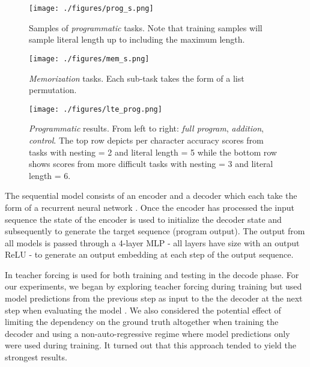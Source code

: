 \documentclass{article}
\begin{document}
\begin{figure}
    \centering
    \texttt{[image: ./figures/prog\_s.png]}
    \caption{Samples of \textit{programmatic} tasks.  Note that training samples will sample literal length up to including the maximum length. }
    \label{fig:psamp}
\end{figure}

\begin{figure}
    \centering
    \texttt{[image: ./figures/mem\_s.png]}
    \caption{\textit{Memorization} tasks.  Each sub-task takes the form of a list permutation. }
    \label{fig:msamp}
\end{figure}

\begin{figure}
    \centering
    \texttt{[image: ./figures/lte\_prog.png]}
    \caption{\textit{Programmatic} results.  From left to right: \textit{full program}, \textit{addition}, \textit{control}. The top row depicts per character accuracy scores from tasks with nesting = 2 and literal length = 5 while the bottom row shows scores from more difficult tasks with nesting = 3 and literal length = 6.}
    \label{fig:lte_results_prog}
\end{figure}


The sequential model consists of an encoder and a decoder which each take the form of a recurrent neural network \cite{sutskever2014seq2seq, zaremba2014lte}.  Once the encoder has processed the input sequence the state of the encoder is used to initialize the decoder state and subsequently to generate the target sequence (program output).  The output from all models is passed through a 4-layer MLP - all layers have size  with an output ReLU - to generate an output embedding at each step of the output sequence.

In \cite{zaremba2014lte} teacher forcing is used for both training and testing in the decode phase.  For our experiments, we began by exploring teacher forcing during training but used model predictions from the previous step as input to the the decoder at the next step when evaluating the model \cite{sutskever2014seq2seq}.  We also considered the potential effect of limiting the dependency on the ground truth altogether when training the decoder \cite{sbengio2015schedsamp} and using a non-auto-regressive regime where model predictions only were used during training.  It turned out that this approach tended to yield the strongest results.
\end{document}
